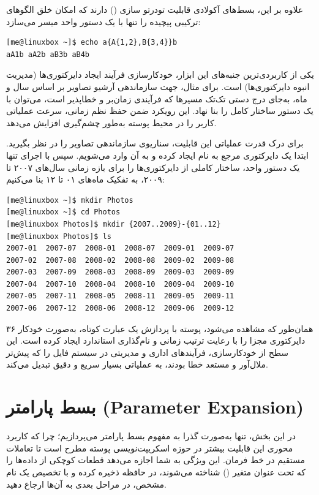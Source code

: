 علاوه بر این، بسط‌های آکولادی قابلیت تودرتو سازی () دارند که امکان خلق الگوهای ترکیبی پیچیده را تنها با یک دستور واحد میسر می‌سازد:

\begin{latin}
\begin{lstlisting}
[me@linuxbox ~]$ echo a{A{1,2},B{3,4}}b
aA1b aA2b aB3b aB4b
\end{lstlisting}
\end{latin}

یکی از کاربردی‌ترین جنبه‌های این ابزار، خودکارسازی فرآیند ایجاد دایرکتوری‌ها (مدیریت انبوه دایرکتوری‌ها) است. برای مثال، جهت سازماندهی آرشیو تصاویر بر اساس سال و ماه، به‌جای درج دستی تک‌تک مسیرها که فرآیندی زمان‌بر و خطا‌پذیر است، می‌توان با یک دستور ساختار کامل را بنا نهاد. این رویکرد ضمن حفظ نظم زمانی، سرعت عملیاتی کاربر را در محیط پوسته به‌طور چشم‌گیری افزایش می‌دهد.

برای درک قدرت عملیاتی این قابلیت، سناریوی سازماندهی تصاویر را در نظر بگیرید. ابتدا یک دایرکتوری مرجع به نام  ایجاد کرده و به آن وارد می‌شویم. سپس با اجرای تنها یک دستور واحد، ساختار کاملی از دایرکتوری‌ها را برای بازه زمانی سال‌های ۲۰۰۷ تا ۲۰۰۹، به تفکیک ماه‌های ۰۱ تا ۱۲ بنا می‌کنیم:

\begin{latin}
\begin{lstlisting}
[me@linuxbox ~]$ mkdir Photos
[me@linuxbox ~]$ cd Photos
[me@linuxbox Photos]$ mkdir {2007..2009}-{01..12}
[me@linuxbox Photos]$ ls
2007-01  2007-07  2008-01  2008-07  2009-01  2009-07
2007-02  2007-08  2008-02  2008-08  2009-02  2009-08
2007-03  2007-09  2008-03  2008-09  2009-03  2009-09
2007-04  2007-10  2008-04  2008-10  2009-04  2009-10
2007-05  2007-11  2008-05  2008-11  2009-05  2009-11
2007-06  2007-12  2008-06  2008-12  2009-06  2009-12
\end{lstlisting}
\end{latin}

همان‌طور که مشاهده می‌شود، پوسته با پردازش یک عبارت کوتاه، به‌صورت خودکار ۳۶ دایرکتوری مجزا را با رعایت ترتیب زمانی و نام‌گذاری استاندارد ایجاد کرده است. این سطح از خودکارسازی، فرآیندهای اداری و مدیریتی در سیستم فایل را که پیش‌تر ملال‌آور و مستعد خطا بودند، به عملیاتی بسیار سریع و دقیق تبدیل می‌کند.

\section{بسط پارامتر (Parameter Expansion)}

در این بخش، تنها به‌صورت گذرا به مفهوم بسط پارامتر می‌پردازیم؛ چرا که کاربرد محوری این قابلیت بیشتر در حوزه اسکریپت‌نویسی پوسته مطرح است تا تعاملات مستقیم در خط فرمان. این ویژگی به شما اجازه می‌دهد قطعات کوچکی از داده‌ها را که تحت عنوان متغیر () شناخته می‌شوند، در حافظه ذخیره کرده و با تخصیص یک نام مشخص، در مراحل بعدی به آن‌ها ارجاع دهید.

